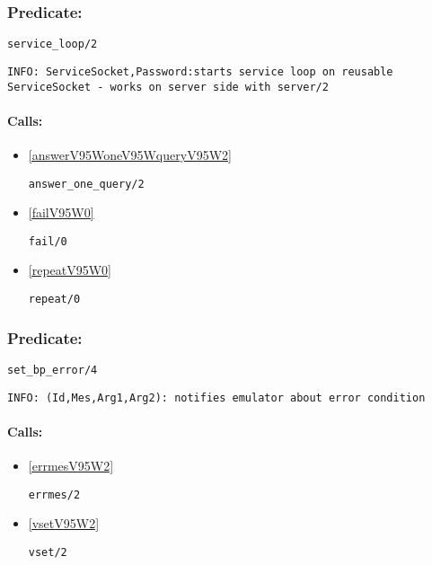 \subsubsection{Predicate:} \label{serviceV95WloopV95W2}

\begin{verbatim}
service_loop/2
\end{verbatim}

{\small \begin{verbatim}
INFO: ServiceSocket,Password:starts service loop on reusable ServiceSocket - works on server side with server/2

\end{verbatim}}
\paragraph{Calls:} 
\begin{itemize}
\item \ref{answerV95WoneV95WqueryV95W2} 
\begin{verbatim}
answer_one_query/2
\end{verbatim}

\item \ref{failV95W0} 
\begin{verbatim}
fail/0
\end{verbatim}

\item \ref{repeatV95W0} 
\begin{verbatim}
repeat/0
\end{verbatim}

\end{itemize}

\subsubsection{Predicate:} \label{setV95WbpV95WerrorV95W4}

\begin{verbatim}
set_bp_error/4
\end{verbatim}

{\small \begin{verbatim}
INFO: (Id,Mes,Arg1,Arg2): notifies emulator about error condition

\end{verbatim}}
\paragraph{Calls:} 
\begin{itemize}
\item \ref{errmesV95W2} 
\begin{verbatim}
errmes/2
\end{verbatim}

\item \ref{vsetV95W2} 
\begin{verbatim}
vset/2
\end{verbatim}

\end{itemize}
